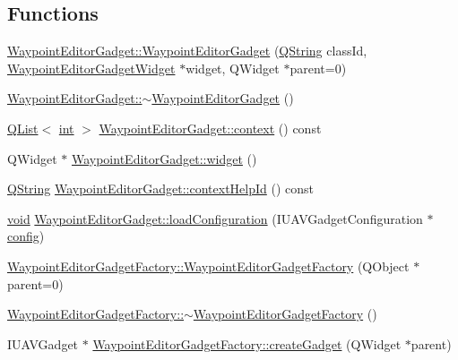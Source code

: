 \subsection*{Functions}
\begin{DoxyCompactItemize}
\item 
\hyperlink{group___waypoint_editor_gadget_plugin_gafb34f259f81e6e7a200d84a3b955734f}{Waypoint\-Editor\-Gadget\-::\-Waypoint\-Editor\-Gadget} (\hyperlink{group___u_a_v_objects_plugin_gab9d252f49c333c94a72f97ce3105a32d}{Q\-String} class\-Id, \hyperlink{class_waypoint_editor_gadget_widget}{Waypoint\-Editor\-Gadget\-Widget} $\ast$widget, Q\-Widget $\ast$parent=0)
\item 
\hyperlink{group___waypoint_editor_gadget_plugin_ga3cdba64c9d39d71291529e2929a63552}{Waypoint\-Editor\-Gadget\-::$\sim$\-Waypoint\-Editor\-Gadget} ()
\item 
\hyperlink{class_q_list}{Q\-List}$<$ \hyperlink{ioapi_8h_a787fa3cf048117ba7123753c1e74fcd6}{int} $>$ \hyperlink{group___waypoint_editor_gadget_plugin_ga90adc26647456b7dcb4bfc8fb0fb80d1}{Waypoint\-Editor\-Gadget\-::context} () const 
\item 
Q\-Widget $\ast$ \hyperlink{group___waypoint_editor_gadget_plugin_ga5c05d17087d355a8f6a0c428c89ccb09}{Waypoint\-Editor\-Gadget\-::widget} ()
\item 
\hyperlink{group___u_a_v_objects_plugin_gab9d252f49c333c94a72f97ce3105a32d}{Q\-String} \hyperlink{group___waypoint_editor_gadget_plugin_ga9aa5c62f07b81e2a3e782fe2581e7a9d}{Waypoint\-Editor\-Gadget\-::context\-Help\-Id} () const 
\item 
\hyperlink{group___u_a_v_objects_plugin_ga444cf2ff3f0ecbe028adce838d373f5c}{void} \hyperlink{group___waypoint_editor_gadget_plugin_ga14051e5dfbb5586837f5a4c092d4ef4c}{Waypoint\-Editor\-Gadget\-::load\-Configuration} (I\-U\-A\-V\-Gadget\-Configuration $\ast$\hyperlink{deflate_8c_a4473b5227787415097004fd39f55185e}{config})
\item 
\hyperlink{group___waypoint_editor_gadget_plugin_ga270c7e089d8d3807f3f5039dd3191327}{Waypoint\-Editor\-Gadget\-Factory\-::\-Waypoint\-Editor\-Gadget\-Factory} (Q\-Object $\ast$parent=0)
\item 
\hyperlink{group___waypoint_editor_gadget_plugin_ga07a37c82dbc7c93b742ed17eac5b6ce4}{Waypoint\-Editor\-Gadget\-Factory\-::$\sim$\-Waypoint\-Editor\-Gadget\-Factory} ()
\item 
I\-U\-A\-V\-Gadget $\ast$ \hyperlink{group___waypoint_editor_gadget_plugin_ga542eee5447d62625cd21c9f57e20a8cb}{Waypoint\-Editor\-Gadget\-Factory\-::create\-Gadget} (Q\-Widget $\ast$parent)

\end{DoxyCompactItemize}
